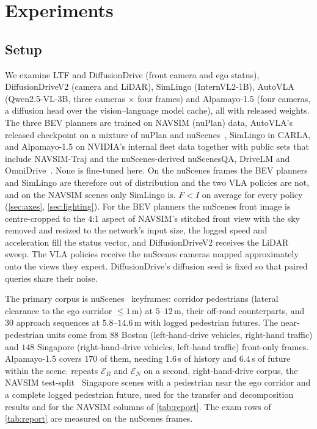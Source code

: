\section{Experiments}
\label{sec:exp}

\subsection{Setup}
\label{sec:setup}
We examine LTF and DiffusionDrive (front camera and ego status), DiffusionDriveV2 (camera and LiDAR),
SimLingo (InternVL2-1B), AutoVLA (Qwen2.5-VL-3B, three cameras $\times$ four frames) and Alpamayo-1.5 (four cameras, a diffusion head over the vision--language model cache), all with released weights. The three BEV planners are trained on NAVSIM (nuPlan) data, AutoVLA's released checkpoint on a mixture of nuPlan and nuScenes~\cite{zhou2025autovla}, SimLingo in CARLA, and Alpamayo-1.5 on NVIDIA's internal fleet data together with public sets that include NAVSIM-Traj and the nuScenes-derived nuScenesQA, DriveLM and OmniDrive~\cite{nvidia2026alpamayo15}. None is fine-tuned here. On the nuScenes frames the BEV planners and SimLingo are therefore out of distribution and the two VLA policies are not, and on the NAVSIM scenes only SimLingo is. $F<I$ on average for every policy (\cref{sec:axes}, \cref{sec:lighting}). For the BEV planners the nuScenes front image is centre-cropped to the 4:1 aspect of NAVSIM's stitched front view with the sky removed and resized to the network's input size, the logged speed and acceleration fill the status vector, and DiffusionDriveV2 receives the LiDAR sweep. The VLA policies receive the nuScenes cameras mapped approximately onto the views they expect. DiffusionDrive's diffusion seed is fixed so that paired queries share their noise.

The primary corpus is nuScenes~\cite{caesar2020nuscenes} keyframes: corridor pedestrians (lateral
clearance to the ego corridor $\le1$\,m) at $5$--$12$\,m, their off-road counterparts, and $30$
approach sequences at $5.8$--$14.6$\,m with logged pedestrian futures. The near-pedestrian units come from $88$ Boston (left-hand-drive vehicles, right-hand traffic) and $148$ Singapore (right-hand-drive vehicles, left-hand traffic) front-only frames. Alpamayo-1.5 covers $170$ of them, needing $1.6$\,s of history and $6.4$\,s of future
within the scene.  repeats $\mathcal{E}_R$ and $\mathcal{E}_N$ on a second, right-hand-drive corpus, the \NumSGscenes{} NAVSIM test-split~\cite{dauner2024navsim} Singapore scenes with a pedestrian near the ego corridor and a complete logged pedestrian future, used for the transfer and decomposition results and for the NAVSIM columns of \cref{tab:report}. The exam rows of \cref{tab:report} are measured on the nuScenes frames.
